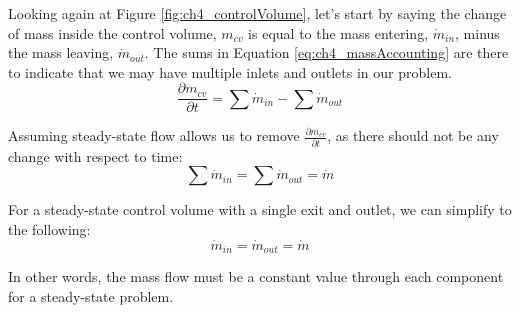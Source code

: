 Looking again at Figure \ref{fig:ch4_controlVolume}, let's start by saying the change of mass inside the control volume, $m_{cv}$ is equal to the mass entering, $\dot{m}_{in}$, minus the mass leaving, $\dot{m}_{out}$.  The sums in Equation \ref{eq:ch4_massAccounting} are there to indicate that we may have multiple inlets and outlets in our problem.
\begin{equation} \label{eq:ch4_massAccounting}
  \frac{\partial m_{cv}}{\partial t} = \sum \dot{m}_{in} - \sum \dot{m}_{out}
\end{equation}

Assuming steady-state flow allows us to remove $\frac{\partial m_{cv}}{\partial t}$, as there should not be any change with respect to time:
\begin{equation} \label{eq:ch4_mdot}
  \sum \dot{m}_{in} = \sum \dot{m}_{out} = \dot{m}
\end{equation}





For a steady-state control volume with a single exit and outlet, we can simplify to the following:
\begin{equation*}
  \dot{m}_{in} = \dot{m}_{out} = \dot{m}
\end{equation*}

In other words, the mass flow must be a constant value through each component for a steady-state problem.


